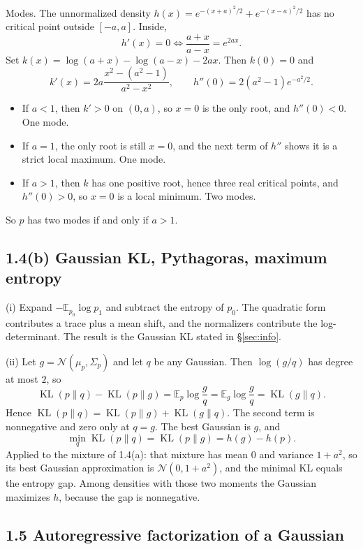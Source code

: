 \documentclass[11pt]{article}
\theoremstyle{remark}
\newcommand{\E}{\mathbb{E}}
\newcommand{\KL}{\operatorname{KL}}
\newcommand{\N}{\mathcal{N}}
\begin{document}
Modes. The unnormalized density \(h(x)=e^{-(x+a)^2/2}+e^{-(x-a)^2/2}\) has no critical point outside \([-a,a]\). Inside,
\[
h'(x)=0\iff\frac{a+x}{a-x}=e^{2ax}.
\]
Set \(k(x)=\log(a+x)-\log(a-x)-2ax\). Then \(k(0)=0\) and
\[
k'(x)=2a\frac{x^2-(a^2-1)}{a^2-x^2},\qquad
h''(0)=2(a^2-1)e^{-a^2/2}.
\]
\begin{itemize}
\item If \(a<1\), then \(k'>0\) on \((0,a)\), so \(x=0\) is the only root, and \(h''(0)<0\). One mode.
\item If \(a=1\), the only root is still \(x=0\), and the next term of \(h''\) shows it is a strict local maximum. One mode.
\item If \(a>1\), then \(k\) has one positive root, hence three real critical points, and \(h''(0)>0\), so \(x=0\) is a local minimum. Two modes.
\end{itemize}
So \(p\) has two modes if and only if \(a>1\).

\subsection*{1.4(b) Gaussian KL, Pythagoras, maximum entropy}

(i) Expand \(-\E_{p_0}\log p_1\) and subtract the entropy of \(p_0\). The quadratic form contributes a trace plus a mean shift, and the normalizers contribute the log-determinant. The result is the Gaussian KL stated in \S\ref{sec:info}.

(ii) Let \(g=\N(\mu_p,\Sigma_p)\) and let \(q\) be any Gaussian. Then \(\log(g/q)\) has degree at most \(2\), so
\[
\KL(p\|q)-\KL(p\|g)=\E_p\log\frac{g}{q}=\E_g\log\frac{g}{q}=\KL(g\|q).
\]
Hence \(\KL(p\|q)=\KL(p\|g)+\KL(g\|q)\). The second term is nonnegative and zero only at \(q=g\). The best Gaussian is \(g\), and
\[
\min_q\KL(p\|q)=\KL(p\|g)=h(g)-h(p).
\]
Applied to the mixture of 1.4(a): that mixture has mean \(0\) and variance \(1+a^2\), so its best Gaussian approximation is \(\N(0,1+a^2)\), and the minimal KL equals the entropy gap. Among densities with those two moments the Gaussian maximizes \(h\), because the gap is nonnegative.

\subsection*{1.5 Autoregressive factorization of a Gaussian}
\end{document}
